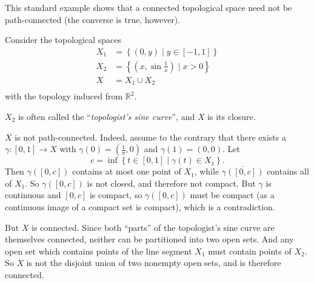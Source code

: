 \documentclass[12pt]{article}
\newcommand{\Reals}{\mathbb{R}}
\begin{document}

This standard example shows that
a connected topological space need not be path-connected
(the converse is true, however).

Consider the topological spaces
\begin{eqnarray*}
X_1 &= \left\{(0,y)\mid y\in[-1,1]\right\}\\
X_2 &= \left\{(x,\sin\frac{1}{x})\mid x>0\right\}\\
X &= X_1 \cup X_2\\
\end{eqnarray*}
with the topology induced from $\Reals^2$.

$X_2$ is often called the ``\emph{topologist's sine curve}'', and $X$ is its closure.

$X$ is not path-connected.
Indeed, assume to the contrary that there exists a 
$\gamma\colon[0,1]\to X$ with
$\gamma(0)=(\frac{1}{\pi},0)$ and $\gamma(1)=(0,0)$.
Let
\[
  c = \inf \left\{ t\in[0,1] \mid \gamma(t)\in X_1 \right\}.
\]
Then $\gamma([0,c])$ contains at most one point of $X_1$,
while $\overline{\gamma([0,c])}$ contains all of $X_1$.
So $\gamma([0,c])$ is not closed, and therefore not compact.
But $\gamma$ is continuous and $[0,c]$ is compact,
so $\gamma([0,c])$ must be compact
(as a continuous image of a compact set is compact),
which is a contradiction.

But $X$ is connected.
Since both ``parts'' of the topologist's sine curve are themselves connected,
neither can be partitioned into two open sets.
And any open set which contains points of the line segment $X_1$
must contain points of $X_2$.
So $X$ is not the disjoint union of two nonempty open sets,
and is therefore connected.
\end{document}
